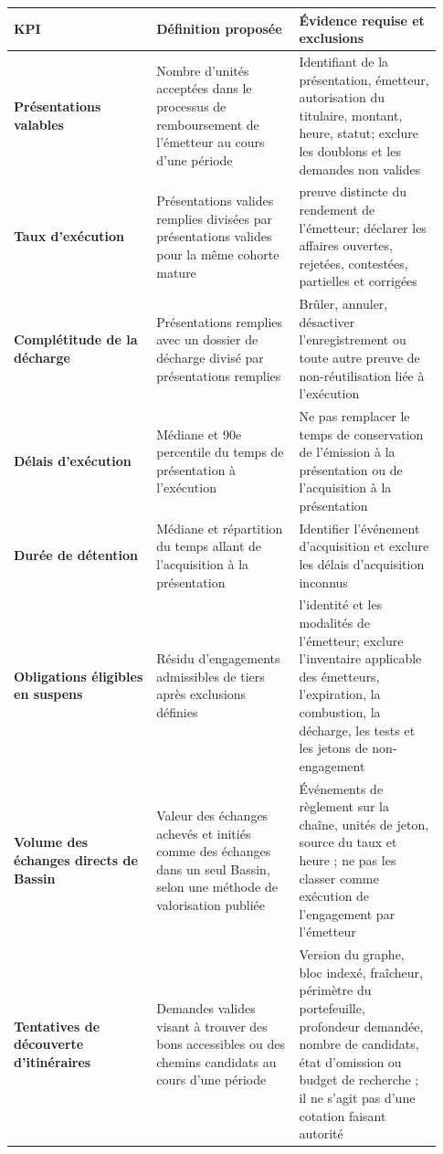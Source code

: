 \documentclass[11pt]{article}
\begin{document}
\begin{longtable}{P{0.31\linewidth} P{0.31\linewidth} P{0.31\linewidth}}
\toprule
KPI & Définition proposée & Évidence requise et exclusions \\
\midrule
\endhead
\textbf{Présentations valables} & Nombre d'unités acceptées dans le processus de remboursement de l'émetteur au cours d'une période & Identifiant de la présentation, émetteur, autorisation du titulaire, montant, heure, statut; exclure les doublons et les demandes non valides \\
\textbf{Taux d'exécution} & Présentations valides remplies divisées par présentations valides pour la même cohorte mature & preuve distincte du rendement de l'émetteur; déclarer les affaires ouvertes, rejetées, contestées, partielles et corrigées \\
\textbf{Complétitude de la décharge} & Présentations remplies avec un dossier de décharge divisé par présentations remplies & Brûler, annuler, désactiver l'enregistrement ou toute autre preuve de non-réutilisation liée à l'exécution \\
\textbf{Délais d'exécution} & Médiane et 90e percentile du temps de présentation à l'exécution & Ne pas remplacer le temps de conservation de l'émission à la présentation ou de l'acquisition à la présentation \\
\textbf{Durée de détention} & Médiane et répartition du temps allant de l'acquisition à la présentation & Identifier l'événement d'acquisition et exclure les délais d'acquisition inconnus \\
\textbf{Obligations éligibles en suspens} & Résidu d'engagements admissibles de tiers après exclusions définies & l'identité et les modalités de l'émetteur; exclure l'inventaire applicable des émetteurs, l'expiration, la combustion, la décharge, les tests et les jetons de non-engagement \\
\textbf{Volume des échanges directs de Bassin} & Valeur des échanges achevés et initiés comme des échanges dans un seul Bassin, selon une méthode de valorisation publiée & Événements de règlement sur la chaîne, unités de jeton, source du taux et heure ; ne pas les classer comme exécution de l'engagement par l'émetteur \\
\textbf{Tentatives de découverte d'itinéraires} & Demandes valides visant à trouver des bons accessibles ou des chemins candidats au cours d'une période & Version du graphe, bloc indexé, fraîcheur, périmètre du portefeuille, profondeur demandée, nombre de candidats, état d'omission ou budget de recherche ; il ne s'agit pas d'une cotation faisant autorité \\

\end{longtable}
\end{document}
